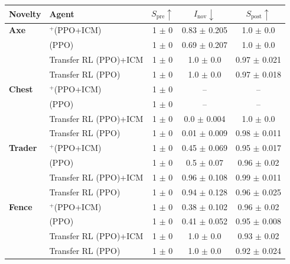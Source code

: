 \begin{table}[t]
\footnotesize
\centering
\begin{tabular}{l l c c c}
\toprule
Novelty & Agent & $S_{\text{pre}} \uparrow$ & $I_{\text{nov}} \downarrow$ & $S_{\text{post}} \uparrow$ \\
\midrule

\textbf{Axe} & \RAPidLearn{}$^{+}$(PPO+ICM) & 1 $\pm$ 0 & 0.83 $\pm$ 0.205 & 1.0 $\pm$ 0.0 \\
             & \RAPidLearn{} (PPO)          & 1 $\pm$ 0 & 0.69 $\pm$ 0.207 & 1.0 $\pm$ 0.0 \\
             & Transfer RL (PPO)+ICM     & 1 $\pm$ 0 & 1.0 $\pm$ 0.0   & 0.97 $\pm$ 0.021 \\
             & Transfer RL (PPO)         & 1 $\pm$ 0 & 1.0 $\pm$ 0.0   & 0.97 $\pm$ 0.018 \\

\midrule
\textbf{Chest} & \RAPidLearn{}$^{+}$(PPO+ICM) & 1 $\pm$ 0 & -- & -- \\
               & \RAPidLearn{} (PPO)          & 1 $\pm$ 0 & -- & -- \\
               & Transfer RL (PPO)+ICM     & 1 $\pm$ 0 & 0.0 $\pm$ 0.004 & 1.0 $\pm$ 0.0 \\
               & Transfer RL (PPO)         & 1 $\pm$ 0 & 0.01 $\pm$ 0.009 & 0.98 $\pm$ 0.011 \\

\midrule
\textbf{Trader} & \RAPidLearn{}$^{+}$(PPO+ICM) & 1 $\pm$ 0 & 0.45 $\pm$ 0.069 & 0.95 $\pm$ 0.017 \\
                & \RAPidLearn{} (PPO)          & 1 $\pm$ 0 & 0.5 $\pm$ 0.07   & 0.96 $\pm$ 0.02 \\
                & Transfer RL (PPO)+ICM     & 1 $\pm$ 0 & 0.96 $\pm$ 0.108 & 0.99 $\pm$ 0.011 \\
                & Transfer RL (PPO)         & 1 $\pm$ 0 & 0.94 $\pm$ 0.128 & 0.96 $\pm$ 0.025 \\

\midrule
\textbf{Fence} & \RAPidLearn{}$^{+}$(PPO+ICM) & 1 $\pm$ 0 & 0.38 $\pm$ 0.102 & 0.96 $\pm$ 0.02 \\
               & \RAPidLearn{} (PPO)          & 1 $\pm$ 0 & 0.41 $\pm$ 0.052 & 0.95 $\pm$ 0.008 \\
               & Transfer RL (PPO)+ICM     & 1 $\pm$ 0 & 1.0 $\pm$ 0.0   & 0.93 $\pm$ 0.02 \\
               & Transfer RL (PPO)         & 1 $\pm$ 0 & 1.0 $\pm$ 0.0   & 0.92 $\pm$ 0.024 \\


\end{tabular}
\end{table}
